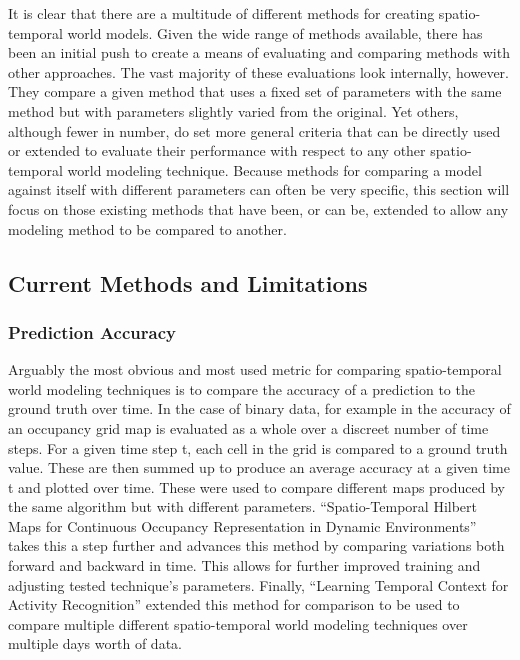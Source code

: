  It is clear that there are a multitude of different methods for creating
  spatio-temporal world models. Given the wide range of methods available,
  there has been an initial push to create a means of evaluating and comparing methods
  with other approaches. The vast majority of these evaluations look internally, however.
  They compare a given method that uses a fixed set of parameters with the same method
  but with parameters slightly varied from the original. Yet others, although fewer
  in number, do set more general criteria that can be directly used or extended
  to evaluate their performance with respect to any other spatio-temporal
  world modeling technique. Because methods for comparing a model against itself
  with different parameters can often be very specific, this section will focus
  on those existing methods that have been, or can be, extended to allow any
  modeling method to be compared to another. \\

  \subsection{ Current Methods and Limitations}

  \subsubsection { Prediction Accuracy }
  Arguably the most obvious and most used metric for comparing spatio-temporal
  world modeling techniques is to compare the accuracy of a prediction
  to the ground truth over time. In the case of binary data, for example in
  \cite{Meyer-Delius2012} the accuracy of an occupancy grid map is evaluated as
  a whole over a discreet number of time steps. For a given time step t,
  each cell in the grid is compared to a ground truth value. These are then
  summed up to produce an average accuracy at a given time t and plotted over
  time. These were used to compare different maps produced by the same algorithm
  but with different parameters.
  ``Spatio-Temporal Hilbert Maps for Continuous Occupancy Representation in Dynamic Environments''\cite{Senanayake2016}
  takes this a step further and advances this method by comparing variations
  both forward and backward in time. This allows for further
  improved training and adjusting tested technique's parameters. Finally,
  ``Learning Temporal Context for Activity Recognition'' \cite{Coppola2016}
  extended this method for comparison to be used to compare multiple different
  spatio-temporal world modeling techniques over multiple days worth of data. \\

